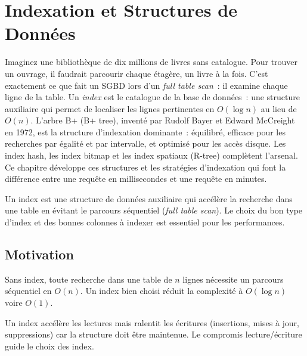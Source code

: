 \chapter{Indexation et Structures de Donn\'ees}
\label{ch:indexation}

Imaginez une biblioth\`eque de dix millions de livres sans catalogue. Pour trouver un ouvrage, il faudrait parcourir chaque \'etag\`ere, un livre \`a la fois. C'est exactement ce que fait un SGBD lors d'un \emph{full table scan}~: il examine chaque ligne de la table. Un \emph{index} est le catalogue de la base de donn\'ees~: une structure auxiliaire qui permet de localiser les lignes pertinentes en $O(\log n)$ au lieu de $O(n)$. L'arbre B+ (B+ tree), invent\'e par Rudolf Bayer et Edward McCreight en 1972, est la structure d'indexation dominante~: \'equilibr\'e, efficace pour les recherches par \'egalit\'e et par intervalle, et optimis\'e pour les acc\`es disque. Les index hash, les index bitmap et les index spatiaux (R-tree) compl\`etent l'arsenal. Ce chapitre d\'eveloppe ces structures et les strat\'egies d'indexation qui font la diff\'erence entre une requ\^ete en millisecondes et une requ\^ete en minutes.

\begin{intuition}[title=\textbf{Id\'ee centrale}]
Un index est une structure de donn\'ees auxiliaire qui acc\'el\`ere la
recherche dans une table en \'evitant le parcours s\'equentiel
(\emph{full table scan}). Le choix du bon type d'index et des bonnes
colonnes \`a indexer est essentiel pour les performances.
\end{intuition}

\section{Motivation}

Sans index, toute recherche dans une table de $n$ lignes n\'ecessite
un parcours s\'equentiel en $O(n)$. Un index bien choisi r\'eduit la
complexit\'e \`a $O(\log n)$ voire $O(1)$.

\begin{remarque}
Un index acc\'el\`ere les lectures mais ralentit les \'ecritures (insertions,
mises \`a jour, suppressions) car la structure doit \^etre maintenue.
Le compromis lecture/\'ecriture guide le choix des index.
\end{remarque}

